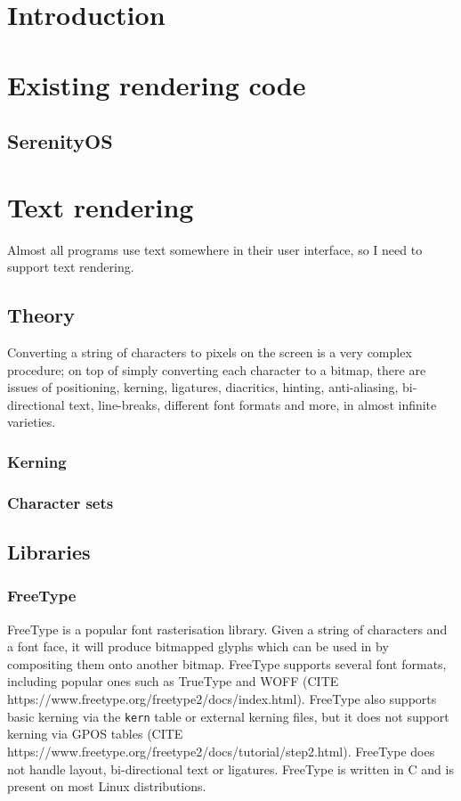 \documentclass[12pt]{article}
\begin{document}
 \section{Introduction}
 \section{Existing rendering code}
  \subsection{SerenityOS}
 \section{Text rendering}
  Almost all programs use text somewhere in their user interface, so I need to support text rendering.
  \subsection{Theory}
   Converting a string of characters to pixels on the screen is a very complex procedure; on top of simply converting each character to a bitmap, there are issues of positioning, kerning, ligatures, diacritics, hinting, anti-aliasing, bi-directional text, line-breaks, different font formats and more, in almost infinite varieties. %
   \subsubsection{Kerning}
   \subsubsection{Character sets}
  \subsection{Libraries}
   \subsubsection{FreeType}
    FreeType is a popular font rasterisation library. Given a string of characters and a font face, it will produce bitmapped glyphs which can be used in by compositing them onto another bitmap. FreeType supports several font formats, including popular ones such as TrueType and WOFF (CITE https://www.freetype.org/freetype2/docs/index.html). FreeType also supports basic kerning via the \texttt{kern} table or external kerning files, but it does not support kerning via GPOS tables (CITE https://www.freetype.org/freetype2/docs/tutorial/step2.html). FreeType does not handle layout, bi-directional text or ligatures. FreeType is written in C and is present on most Linux distributions.
\end{document}
